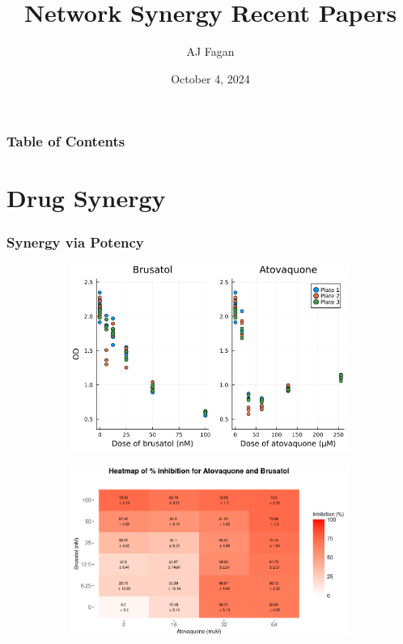 \documentclass{beamer}
\author{AJ Fagan}
\title{Network Synergy Recent Papers}
\date{October 4, 2024}
\begin{document}
\frame{\titlepage}


\begin{frame}
  \frametitle{Table of Contents}
  \tableofcontents 
\end{frame}

\section{Drug Synergy}

\begin{frame}
  \frametitle{Synergy via Potency}
  \begin{figure}[!htb]
      \centering 
      \begin{minipage}[b]{0.49\textwidth}
	\begin{subfigure}[b]{\textwidth}
	  \centering
	  \includegraphics[width=\linewidth]{figs/mono-dose-resp.png}
	\end{subfigure}\vfill
	\begin{subfigure}[c]{\textwidth}
	  \centering
	  \includegraphics[width=\linewidth]{figs/ato-bru-resp-heatmap.png}

\end{subfigure}
\end{minipage}
\end{figure}
\end{frame}
\end{document}
